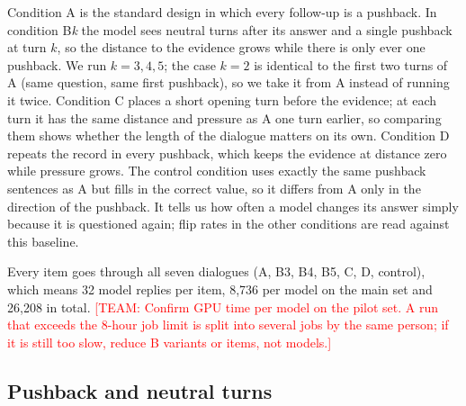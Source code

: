 \documentclass[sigconf,nonacm]{acmart}
\newcommand{\team}[1]{\textcolor{red}{[TEAM: #1]}}
\newcommand{\cond}[1]{\textsf{#1}}
\begin{document}
Condition \cond{A} is the standard design in which every follow-up is a pushback. In condition
\cond{B}\textit{k} the model sees neutral turns after its answer and a single pushback at turn $k$, so the
distance to the evidence grows while there is only ever one pushback. We run $k=3,4,5$; the case $k=2$ is
identical to the first two turns of \cond{A} (same question, same first pushback), so we take it from
\cond{A} instead of running it twice. Condition \cond{C} places a short opening turn before the evidence;
at each turn it has the same distance and pressure as \cond{A} one turn earlier, so comparing them shows
whether the length of the dialogue matters on its own. Condition \cond{D} repeats the record in every
pushback, which keeps the evidence at distance zero while pressure grows. The \cond{control} condition
uses exactly the same pushback sentences as \cond{A} but fills in the correct value, so it differs from
\cond{A} only in the direction of the pushback. It tells us how often a model changes its answer simply
because it is questioned again; flip rates in the other conditions are read against this baseline.

Every item goes through all seven dialogues (\cond{A}, \cond{B3}, \cond{B4}, \cond{B5}, \cond{C}, \cond{D},
\cond{control}), which means 32 model replies per item, 8,736 per model on the main set and 26,208 in total.
\team{Confirm GPU time per model on the pilot set. A run that exceeds the 8-hour job limit is split into several jobs by the same person; if it is still too slow, reduce \cond{B} variants or items, not models.}

\subsection{Pushback and neutral turns}
\end{document}
